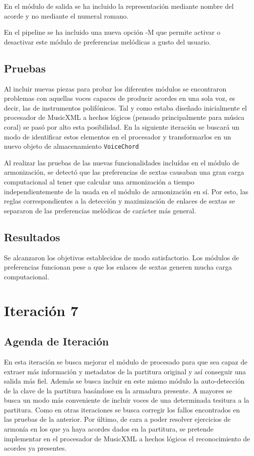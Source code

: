 En el módulo de salida se ha incluido la representación mediante nombre del acorde y no mediante el numeral romano.

En el pipeline se ha incluido una nueva opción -M que permite activar o desactivar este módulo de preferencias melódicas a gusto del usuario. 

\subsection{Pruebas}
\label{subsec:sixth_iteration_test}
Al incluir nuevas piezas para probar los diferentes módulos se encontraron problemas con aquellas voces capaces de producir acordes en una sola voz, es decir, las de instrumentos polifónicos. Tal y como estaba diseñado inicialmente el procesador de MusicXML a hechos lógicos (pensado principalmente para música coral) se pasó por alto esta posibilidad. En la siguiente iteración se buscará un modo de identificar estos elementos en el procesador y transformarlos en un nuevo objeto de almacenamiento \texttt{VoiceChord}

Al realizar las pruebas de las nuevas funcionalidades incluídas en el módulo de armonización, se detectó que las preferencias de sextas causaban una gran carga computacional al tener que calcular una armonización a tiempo independientemente de la usada en el módulo de armonización en sí. Por esto, las reglas correspondientes a la detección y maximización de enlaces de sextas se separaron de las preferencias melódicas de carácter más general. 

\subsection{Resultados}
\label{subsec:sixth_iteration_results}
Se alcanzaron los objetivos establecidos de modo satisfactorio.
Los módulos de preferencias funcionan pese a que los enlaces de sextas generen mucha carga computacional.

\section{Iteración 7}
\label{sec:seventh_iteration}
\subsection{Agenda de Iteración}
\label{subsec:seventh_iteration_backlog}
En esta iteración se busca mejorar el módulo de procesado para que sea capaz de extraer más información y metadatos de la partitura original y así conseguir una salida más fiel. Además se busca incluir en este mismo módulo la auto-detección de la clave de la partitura basándose en la armadura presente. A mayores se busca un modo más conveniente de incluir voces de una determinada tesitura a la partitura. Como en otras iteraciones se busca corregir los fallos encontrados en las pruebas de la anterior. Por último, de cara a poder resolver ejercicios de armonía en los que ya haya acordes dados en la partitura, se pretende implementar en el procesador de MusicXML a hechos lógicos el reconocimiento de acordes ya presentes.

